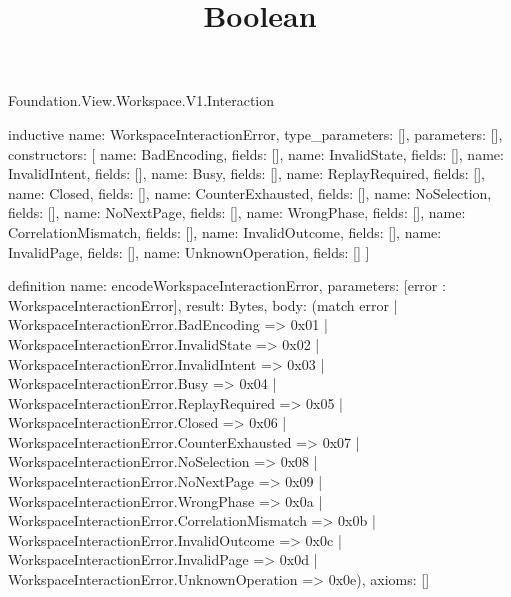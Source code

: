 \begin{lexlean}{Foundation.View.Workspace.V1.Interaction}
\title{Boolean}
\begin{semanticmodule}
inductive{
  name: WorkspaceInteractionError,
  type_parameters: [],
  parameters: [],
  constructors: [
    {name: BadEncoding, fields: []},
    {name: InvalidState, fields: []},
    {name: InvalidIntent, fields: []},
    {name: Busy, fields: []},
    {name: ReplayRequired, fields: []},
    {name: Closed, fields: []},
    {name: CounterExhausted, fields: []},
    {name: NoSelection, fields: []},
    {name: NoNextPage, fields: []},
    {name: WrongPhase, fields: []},
    {name: CorrelationMismatch, fields: []},
    {name: InvalidOutcome, fields: []},
    {name: InvalidPage, fields: []},
    {name: UnknownOperation, fields: []}
  ]
}

definition{
  name: encodeWorkspaceInteractionError,
  parameters: [error : WorkspaceInteractionError],
  result: Bytes,
  body: (match error
    | WorkspaceInteractionError.BadEncoding => 0x01
    | WorkspaceInteractionError.InvalidState => 0x02
    | WorkspaceInteractionError.InvalidIntent => 0x03
    | WorkspaceInteractionError.Busy => 0x04
    | WorkspaceInteractionError.ReplayRequired => 0x05
    | WorkspaceInteractionError.Closed => 0x06
    | WorkspaceInteractionError.CounterExhausted => 0x07
    | WorkspaceInteractionError.NoSelection => 0x08
    | WorkspaceInteractionError.NoNextPage => 0x09
    | WorkspaceInteractionError.WrongPhase => 0x0a
    | WorkspaceInteractionError.CorrelationMismatch => 0x0b
    | WorkspaceInteractionError.InvalidOutcome => 0x0c
    | WorkspaceInteractionError.InvalidPage => 0x0d
    | WorkspaceInteractionError.UnknownOperation => 0x0e),
  axioms: []
}


\end{semanticmodule}
\end{lexlean}
